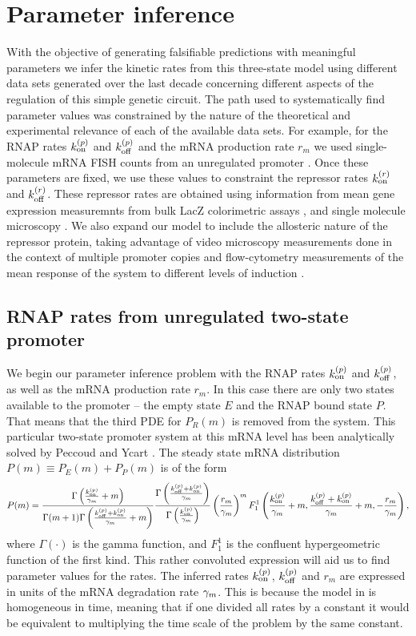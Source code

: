 \section{Parameter inference}

With the objective of generating falsifiable predictions with meaningful
parameters we infer the kinetic rates from this three-state model using
different data sets generated over the last decade concerning different aspects
of the regulation of this simple genetic circuit. The path used to
systematically find parameter values was constrained by the nature of the
theoretical and experimental relevance of each of the available data sets. For
example, for the RNAP rates $k^{(p)}_{\text{on}}$ and $k^{(p)}_{\text{off}}$ and the mRNA production rate
$r_m$ we used single-molecule mRNA FISH counts from an unregulated promoter
\cite{Jones2014a}. Once these parameters are fixed, we use these values to
constraint the repressor rates $k^{(r)}_{\text{on}}$ and $k^{(r)}_{\text{off}}$. These repressor rates are
obtained using information from mean gene expression measuremnts from bulk LacZ
colorimetric assays \cite{Garcia2011c}, and single molecule microscopy
\cite{Elf2007}. We also expand our model to include the allosteric nature of the
repressor protein, taking advantage of video microscopy measurements done in the
context of multiple promoter copies \cite{Brewster2014} and flow-cytometry
measurements of the mean response of the system to different levels of induction
\cite{Razo-Mejia2018}.

\subsection{RNAP rates from unregulated two-state promoter}

We begin our parameter inference problem with the RNAP rates $k^{(p)}_{\text{on}}$ and
$k^{(p)}_{\text{off}}$, as well as the mRNA production rate $r_m$. In this case there
are only two states  available to the promoter -- the empty state $E$ and the
RNAP bound state $P$. That means that the third PDE for $P_R(m)$ is removed from
the system. This particular two-state promoter system at this mRNA level has
been analytically solved by Peccoud and Ycart \cite{Peccoud1995}. The steady
state mRNA distribution $P(m) \equiv P_E(m) + P_P(m)$ is of the form
\begin{equation}
  P(m) = {\Gamma \left( \frac{k^{(p)}_{\text{on}}}{\gamma _m} + m \right) \over
  \Gamma(m + 1) \Gamma\left( \frac{k^{(p)}_{\text{off}}+k^{(p)}_{\text{on}}}{\gamma _m} + m \right)}
  {\Gamma\left( \frac{k^{(p)}_{\text{off}}+k^{(p)}_{\text{on}}}{\gamma _m} \right) \over
  \Gamma\left( \frac{k^{(p)}_{\text{on}}}{\gamma _m} \right)}
  \left( {r_m \over \gamma _m} \right)^m
  F_1^1 \left( {k^{(p)}_{\text{on}} \over \gamma _m} + m,
  {k^{(p)}_{\text{off}} + k^{(p)}_{\text{on}} \over \gamma _m} + m,
  -{r_m \over \gamma _m} \right),
  \label{eq_two_state_mRNA}
\end{equation}
where $\Gamma(\cdot)$ is the gamma function, and $F_1^1$ is the confluent
hypergeometric function of the first kind. This rather convoluted expression
will aid us to find parameter values for the rates. The inferred rates $k^{(p)}_{\text{on}}$,
$k^{(p)}_{\text{off}}$ and $r_m$ are expressed in units of the mRNA degradation rate $\gamma _m$.
This is because the model in  is homogeneous in time,
meaning that if one divided all rates by a constant it would be equivalent to
multiplying the time scale of the problem by the same constant.

